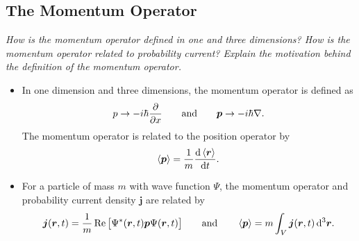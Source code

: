 \documentclass[11pt, a4paper]{article}
\newcommand{\diff}{\mathop{}\!\mathrm{d}} %
\newcommand{\dr}{\diff^{3} \r}  %
\renewcommand{\grad}{\nabla}
\newcommand{\eqtext}[1]{\qquad \text{#1} \qquad}
\renewcommand{\vec}[1]{\bm{#1}}  %
\renewcommand{\r}{\vec{r}}  %
\renewcommand{\P}{\Psi}  %
\begin{document}
\subsection{The Momentum Operator}
\textit{How is the momentum operator defined in one and three dimensions? How is the momentum operator related to probability current? Explain the motivation behind the definition of the momentum operator.}
\begin{itemize}
	\item In one dimension and three dimensions, the momentum operator is defined as
	\begin{equation*}
		p \to - i \hbar \pdv{x} \qquad \text{and} \qquad \vec{p} \to - i \hbar \grad.
	\end{equation*}
    The momentum operator is related to the position operator by
    \begin{equation*}
        \ev{\vec{p}} = \frac{1}{m} \dv{\ev{\r}}{t}.
    \end{equation*}
    
    
	
    \item For a particle of mass $ m $ with wave function $ \Psi $, the momentum operator and probability current density $ \vec{j} $ are related by
	\begin{equation*}
		\vec{j}(\r, t) = \frac{1}{m}\Re \big[\P^{*}(\r, t) \vec{p} \P(\r, t)\big] \eqtext{and} \ev{\bm{p}}  = m \int_{V} \vec{j}(\r, t) \dr.
	\end{equation*}
\end{itemize}
\end{document}

